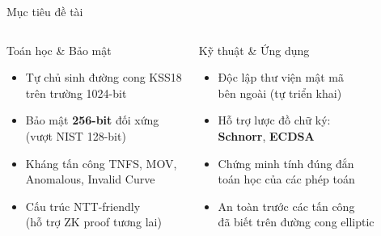 \begin{frame}{Mục tiêu đề tài}
  \begin{columns}[t]
      \begin{block}{Toán học \& Bảo mật}
        \begin{itemize}
          \item Tự chủ sinh đường cong KSS18\\trên trường 1024-bit
          \item Bảo mật \textbf{256-bit} đối xứng\\(vượt NIST 128-bit)
          \item Kháng tấn công TNFS, MOV,\\Anomalous, Invalid Curve
          \item Cấu trúc NTT-friendly\\(hỗ trợ ZK proof tương lai)
        \end{itemize}
      \end{block}
      \begin{block}{Kỹ thuật \& Ứng dụng}
        \begin{itemize}
          \item Độc lập thư viện mật mã\\bên ngoài (tự triển khai)
          \item Hỗ trợ lược đồ chữ ký:\\\textbf{Schnorr}, \textbf{ECDSA}
          \item Chứng minh tính đúng đắn\\toán học của các phép toán
          \item An toàn trước các tấn công\\đã biết trên đường cong elliptic
        \end{itemize}
      \end{block}
  \end{columns}
\end{frame}
